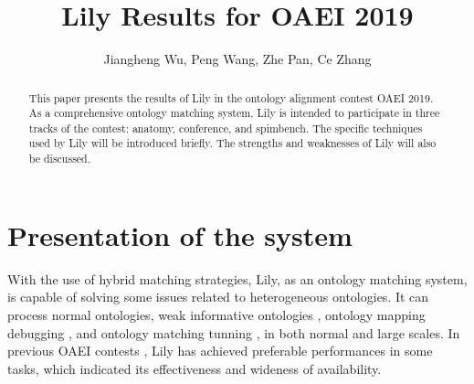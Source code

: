 \documentclass[runningheads]{llncs}
\begin{document}
\mainmatter              %
\title{Lily Results for OAEI 2019}
\author{Jiangheng Wu, Peng Wang, Zhe Pan, Ce Zhang}


\maketitle

\begin{abstract}
This paper presents the results of Lily in the ontology alignment contest OAEI 2019. 
As a comprehensive ontology matching system, Lily is intended to participate in three tracks of the contest: anatomy, conference, and spimbench. 
The specific techniques used by Lily will be introduced briefly. 
The strengths and weaknesses of Lily will also be discussed.
\end{abstract}

\section{Presentation of the system}
With the use of hybrid matching strategies, Lily, as an ontology matching system, is capable of solving some issues related to heterogeneous ontologies. 
It can process normal ontologies, weak informative ontologies \cite{wang2009effective}, ontology mapping debugging \cite{wang2012debugging}, and ontology matching tunning \cite{yang2014ontology}, in both normal and large scales. 
In previous OAEI contests \cite{lily_oaei2018, lily_oaei2016, lily_oaei2015, lily_oaei2011, lily_oaei2009,lily_oaei2008,lily_oaei2007}, Lily has achieved preferable performances in some tasks, which indicated its effectiveness and wideness of availability. \par
\end{document}
